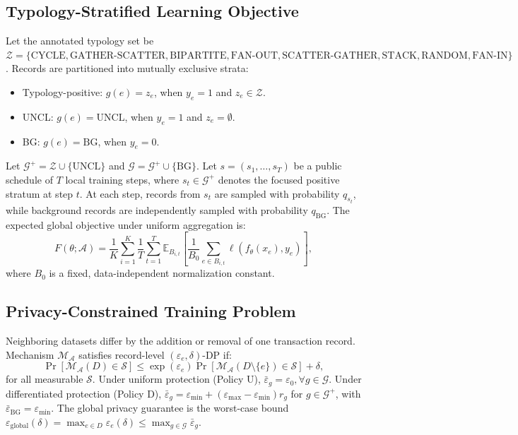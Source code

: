 \documentclass[conference]{IEEEtran}
\begin{document}
\subsection{Typology-Stratified Learning Objective}
Let the annotated typology set be $\mathcal{Z} = \{\text{CYCLE}, \text{GATHER-SCATTER}, \text{BIPARTITE}, \text{FAN-OUT}, \text{SCATTER-GATHER}, \text{STACK}, \text{RANDOM}, \text{FAN-IN}\}$. Records are partitioned into mutually exclusive strata:
\begin{itemize}
    \item Typology-positive: $g(e) = z_e$, when $y_e = 1$ and $z_e \in \mathcal{Z}$.
    \item UNCL: $g(e) = \text{UNCL}$, when $y_e = 1$ and $z_e = \emptyset$.
    \item BG: $g(e) = \text{BG}$, when $y_e = 0$.
\end{itemize}
Let $\mathcal{G}^+ = \mathcal{Z} \cup \{\text{UNCL}\}$ and $\mathcal{G} = \mathcal{G}^+ \cup \{\text{BG}\}$. Let $s = (s_1, \dots, s_T)$ be a public schedule of $T$ local training steps, where $s_t \in \mathcal{G}^+$ denotes the focused positive stratum at step $t$. At each step, records from $s_t$ are sampled with probability $q_{s_t}$, while background records are independently sampled with probability $q_{\text{BG}}$. The expected global objective under uniform aggregation is:
\begin{equation}
F(\theta; \mathcal{A}) = \frac{1}{K} \sum_{i=1}^K \frac{1}{T} \sum_{t=1}^T \mathbb{E}_{B_{i,t}} \left[ \frac{1}{B_0} \sum_{e \in B_{i,t}} \ell(f_\theta(x_e), y_e) \right],
\end{equation}
where $B_0$ is a fixed, data-independent normalization constant.

\subsection{Privacy-Constrained Training Problem}
Neighboring datasets differ by the addition or removal of one transaction record. Mechanism $\mathcal{M}_{\mathcal{A}}$ satisfies record-level $(\varepsilon_e, \delta)$-DP if:
\begin{equation}
\Pr[\mathcal{M}_{\mathcal{A}}(D) \in \mathcal{S}] \le \exp(\varepsilon_e) \Pr[\mathcal{M}_{\mathcal{A}}(D \setminus \{e\}) \in \mathcal{S}] + \delta,
\end{equation}
for all measurable $\mathcal{S}$. Under uniform protection (Policy U), $\bar{\varepsilon}_g = \varepsilon_0, \forall g \in \mathcal{G}$. Under differentiated protection (Policy D), $\bar{\varepsilon}_g = \varepsilon_{\min} + (\varepsilon_{\max} - \varepsilon_{\min}) r_g$ for $g \in \mathcal{G}^+$, with $\bar{\varepsilon}_{\text{BG}} = \varepsilon_{\min}$. The global privacy guarantee is the worst-case bound $\varepsilon_{\text{global}}(\delta) = \max_{e \in D} \varepsilon_e(\delta) \le \max_{g \in \mathcal{G}} \bar{\varepsilon}_g$.
\end{document}
